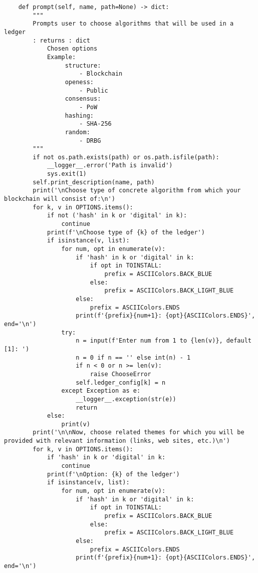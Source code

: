 \begin{lstlisting}
    def prompt(self, name, path=None) -> dict:
        """
        Prompts user to choose algorithms that will be used in a ledger
        : returns : dict
            Chosen options
            Example:
                 structure:
                     - Blockchain
                 openess:
                     - Public
                 consensus:
                     - PoW
                 hashing:
                     - SHA-256
                 random:
                     - DRBG
        """
        if not os.path.exists(path) or os.path.isfile(path):
            __logger__.error('Path is invalid')
            sys.exit(1)
        self.print_description(name, path)
        print('\nChoose type of concrete algorithm from which your blockchain will consist of:\n')
        for k, v in OPTIONS.items():
            if not ('hash' in k or 'digital' in k):
                continue
            print(f'\nChoose type of {k} of the ledger')
            if isinstance(v, list):
                for num, opt in enumerate(v):
                    if 'hash' in k or 'digital' in k:
                        if opt in TOINSTALL:
                            prefix = ASCIIColors.BACK_BLUE
                        else:
                            prefix = ASCIIColors.BACK_LIGHT_BLUE
                    else:
                        prefix = ASCIIColors.ENDS
                    print(f'{prefix}{num+1}: {opt}{ASCIIColors.ENDS}', end='\n')
                try:
                    n = input(f'Enter num from 1 to {len(v)}, default [1]: ')
                    n = 0 if n == '' else int(n) - 1
                    if n < 0 or n >= len(v):
                        raise ChooseError
                    self.ledger_config[k] = n
                except Exception as e:
                    __logger__.exception(str(e))
                    return
            else:
                print(v)
        print('\n\nNow, choose related themes for which you will be provided with relevant information (links, web sites, etc.)\n')
        for k, v in OPTIONS.items():
            if 'hash' in k or 'digital' in k:
                continue
            print(f'\nOption: {k} of the ledger')
            if isinstance(v, list):
                for num, opt in enumerate(v):
                    if 'hash' in k or 'digital' in k:
                        if opt in TOINSTALL:
                            prefix = ASCIIColors.BACK_BLUE
                        else:
                            prefix = ASCIIColors.BACK_LIGHT_BLUE
                    else:
                        prefix = ASCIIColors.ENDS
                    print(f'{prefix}{num+1}: {opt}{ASCIIColors.ENDS}', end='\n')

\end{lstlisting}
